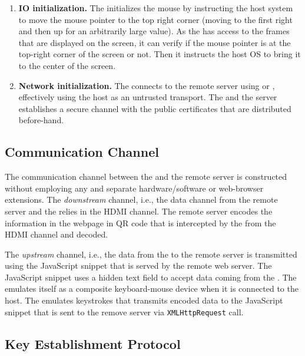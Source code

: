 \begin{enumerate}
  \item\textbf{IO initialization.} The \device initializes the mouse by instructing the host system to move the mouse pointer to the top right corner (moving to the first right and then up for an arbitrarily large value). As the \device has access to the frames that are displayed on the screen, it can verify if the mouse pointer is at the top-right corner of the screen or not. Then it instructs the host OS to bring it to the center of the screen.
  
  \item\textbf{Network initialization.} The \device connects to the remote server using \webusb or \webbt, effectively using the host as an untrusted transport. The \device and the server establishes a secure channel with the public certificates that are distributed before-hand.
\end{enumerate}


\subsection{Communication Channel}
\label{sec:systemDesign:communicationChannel}

The communication channel between the \device and the remote server is constructed without employing any and separate hardware/software or web-browser extensions. The \emph{downstream} channel, i.e., the data channel from the remote server and the \device relies in the HDMI channel. The remote server encodes the information in the webpage in QR code that is intercepted by the \device from the HDMI channel and decoded.

The \emph{upstream} channel, i.e., the data from the \device to the remote server is transmitted using the \name JavaScript snippet that is served by the remote web server. The \name JavaScript snippet uses a hidden text field to accept data coming from the \device. The \device emulates itself as a composite keyboard-mouse device when it is connected to the host. The \device emulates keystrokes that transmits encoded data to the \name JavaScript snippet that is sent to the remove server via \texttt{XMLHttpRequest} call.


\subsection{Key Establishment Protocol}
\label{sec:systemDesign:keyEstablishment}

